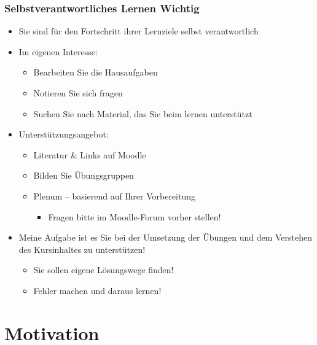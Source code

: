 \documentclass[xcolor=dvipsnames,aspectratio=169]{beamer}
\begin{document}
\begin{frame}
	\frametitle{Selbstverantwortliches Lernen \textbf{Wichtig}}
	\begin{itemize}
		\item Sie sind für den Fortschritt ihrer Lernziele selbst verantwortlich
		\item Im eigenen Interesse:
		\begin{itemize}
			\item Bearbeiten Sie die Hausaufgaben
			\item Notieren Sie sich fragen
			\item Suchen Sie nach Material, das Sie beim lernen unterstützt
		\end{itemize}
		\item Unterstützungsangebot:
		\begin{itemize}
			\item Literatur \& Links auf Moodle
			\item Bilden Sie Übungsgruppen
			\item Plenum -- basierend auf Ihrer Vorbereitung
			\begin{itemize}
				\item Fragen bitte im Moodle-Forum vorher stellen!
			\end{itemize}
		\end{itemize}
		\item Meine Aufgabe ist es Sie bei der Umsetzung der Übungen und dem Verstehen des Kursinhaltes zu unterstützen!
		\begin{itemize}
			\item Sie sollen eigene Lösungswege finden!
			\item Fehler machen und daraus lernen!
		\end{itemize}
	\end{itemize}
\end{frame}


\section{Motivation}
\end{document}

